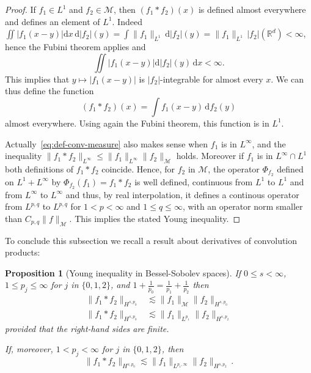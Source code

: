 \documentclass[12pt]{article}
\theoremstyle{plain}
\newtheorem{prop}[theo]{Proposition}
\newcommand{\meas}{\mathcal{M}}
\newcommand{\diff}{\mathrm{d}}
\begin{document}
\begin{proof}
If $f_1\in L^{1}$ and $f_2 \in\meas$, then $(f_1*f_2)(x)$ is defined almost everywhere and defines an element of $L^{1}$. Indeed $\iint|f_1(x-y)|\diff x\,\mathrm{d}|f_2|(y)=\int\|f_1\|_{L^{1}}\,\diff |f_2|(y)=\|f_1\|_{L^{1}}\,|f_2|(\mathbb{R}^{d})<\infty$, hence the Fubini theorem applies and 
\[
\iint|f_1(x-y)|\diff |f_2|(y)\,\diff x<\infty.
\]
This implies that $y\mapsto|f_1(x-y)|$ is $|f_2|$-integrable for almost every $x$. We can thus define the function
\begin{equation}
(f_1*f_2)(x)=\int f_1(x-y)\,\diff f_2(y) \label{eq:def-conv-measure}
\end{equation}
almost everywhere. Using again the Fubini theorem, this function is in $L^1$. 

Actually~\eqref{eq:def-conv-measure} also makes sense when $f_1$ is in $L^\infty$, and the inequality $\|f_1*f_2\|_{L^\infty}\leq \|f_1\|_{L^\infty} \|f_2\|_{\meas}$ holds. Moreover if $f_1$ is in $L^\infty \cap L^1$ both definitions of $f_1*f_2$ coincide. Hence, for $f_2$ in $\meas$, the operator $\Phi_{f_2}$ defined on $L^1+L^\infty$ by $\Phi_{f_2}(f_1)=f_1*f_2$ is well defined, continuous from $L^1$ to $L^1$ and from $L^\infty$ to $L^\infty$ and thus, by real interpolation, it defines a continous operator from $L^{p,q}$ to $L^{p,q}$ for $1<p<\infty$ and $1\leq q\leq \infty$, with an operator norm smaller than $C_{p,q}\|f\|_{\meas}$. This implies the stated Young inequality.
\end{proof}

To conclude this subsection we recall a result about derivatives of convolution products:
\begin{prop}[Young inequality in Bessel-Sobolev spaces]
    If $0\leq s < \infty$, $1\leq p_j \leq \infty$ for $j$ in $\{0,1,2\}$, and $1+\frac1{p_0}=\frac1{p_1}+\frac1{p_2}$ then
    \begin{align}
    \|f_1* f_2\|_{H^{s,p_0}} 
    &\lesssim \|f_1\|_{\meas} \|f_2\|_{H^{s,p_0}} \label{eq:conv-M-Hsp}\\
    \|f_1* f_2\|_{H^{s,p_0}} 
    & \lesssim \|f_1\|_{L^{p_1}} \|f_2\|_{H^{s,p_2}}
    \end{align}
    provided that the right-hand sides are finite.
    
    If, moreover, $1< p_j < \infty$ for $j$ in $\{0,1,2\}$, then
    \begin{equation}
    \|f_1* f_2\|_{H^{s,p_0}} 
     \lesssim \|f_1\|_{L^{p_1,\infty}} \|f_2\|_{H^{s,p_2}}\,.
    \end{equation}
\end{prop}
\end{document}
